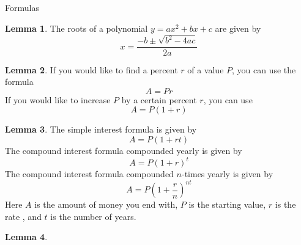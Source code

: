 \documentclass[addpoints,12pt]{exam}
\theoremstyle{definition}
\newtheorem{lemma}{Lemma}
\begin{document}
\begin{center}
\end{center}
\vspace{0.1in}
\vspace{0.2in}



\begin{center}
    \Huge Formulas
\end{center}

\begin{lemma}
    The roots of a polynomial $y = ax^{2}+bx+c$ are given by 
		\[
		x = \frac{-b \pm \sqrt{b^{2}-4ac}}{2a}
		\]
\end{lemma}

\begin{lemma}
    If you would like to find a percent $r$ of a value $P$, you can use the formula 
		\[
		A = Pr
		\]
		If you would like to increase $P$ by a certain percent $r$, you can use 
		\[
		A = P(1+r)
		\]
\end{lemma}

\begin{lemma}
	The simple interest formula is given by 
    \[
    A = P(1+rt)
    \]
		The compound interest formula compounded yearly is given by 
		\[
		A = P(1+r)^{t} 
		\]
		The compound interest formula compounded $n$-times yearly is given by 
		\[
		A = P(1+\frac{r}{n})^{nt}
		\]
		Here $A$ is the amount of money you end with, $P$ is the starting value, $r$ is the rate , and $t$ is the number of years. 
		    
\end{lemma}
\begin{lemma}
    
\end{lemma}
\end{document}
